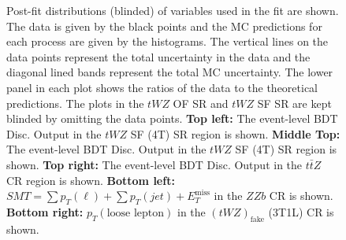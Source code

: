 \begin{figure}[htbp]
        \caption{Post-fit distributions (blinded) of variables used in the fit are shown. The data is given by the black points and the MC predictions for each process are given by the histograms. The vertical lines on the data points represent the total uncertainty in the data and the diagonal lined bands represent the total MC uncertainty. The lower panel in each plot shows the ratios of the data to the theoretical predictions. The plots in the $tWZ$ OF SR and $tWZ$ SF SR are kept blinded by omitting the data points. \textbf{Top left:} The event-level BDT Disc. Output in the $tWZ$ SF (4T) SR region is shown. \textbf{Middle Top:} The event-level BDT Disc. Output in the $tWZ$ SF (4T) SR region is shown. \textbf{Top right:} The event-level BDT Disc. Output in the $t\bar{t}Z$ CR region is shown. \textbf{Bottom left:} $SMT = \sum p_{T} (\ell) + \sum p_{T} (jet) + E_{T}^{\text{miss}}$ in the $ZZb$ CR is shown. \textbf{Bottom right:} $p_{T}(\text{loose lepton})$ in the $(tWZ)_{\text{fake}}$ (3T1L) CR is shown.}
  \label{fig:4lep-postfitPlots}
\end{figure}

